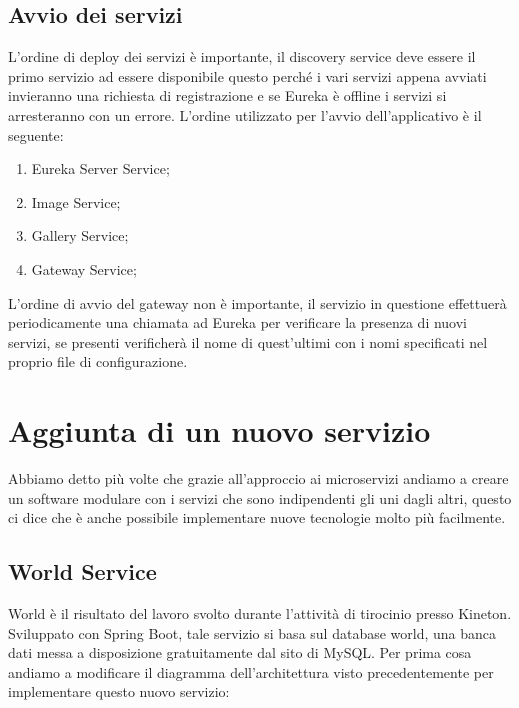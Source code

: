 \subsection{Avvio dei servizi}
L'ordine di deploy dei servizi è importante, il discovery service deve essere il primo servizio ad essere disponibile questo perché i vari servizi appena avviati invieranno una richiesta di registrazione e se Eureka è offline i servizi si arresteranno con un errore. L'ordine utilizzato per l'avvio dell'applicativo è il seguente:

\begin{enumerate}
    \item Eureka Server Service;
    \item Image Service;
    \item Gallery Service;
    \item Gateway Service;
\end{enumerate}

L'ordine di avvio del gateway non è importante, il servizio in questione effettuerà periodicamente una chiamata ad Eureka per verificare la presenza di nuovi servizi, se presenti verificherà il nome di quest'ultimi con i nomi specificati nel proprio file di configurazione.

\section{Aggiunta di un nuovo servizio}
Abbiamo detto più volte che grazie all'approccio ai microservizi andiamo a creare un software modulare con i servizi che sono indipendenti gli uni dagli altri, questo ci dice che è anche possibile implementare nuove tecnologie molto più facilmente.

\subsection{World Service}
World è il risultato del lavoro svolto durante l'attività di tirocinio presso Kineton. Sviluppato con Spring Boot, tale servizio si basa sul database world, una banca dati messa a disposizione gratuitamente dal sito di MySQL. Per prima cosa andiamo a modificare il diagramma dell'architettura visto precedentemente per implementare questo nuovo servizio:

